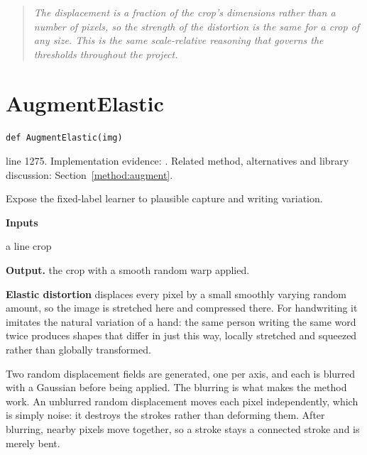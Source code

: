 \begin{quote}\small\itshape The displacement is a fraction of the crop's dimensions rather than a number of pixels, so the strength of the distortion is the same for a crop of any size. This is the same scale-relative reasoning that governs the thresholds throughout the project.\end{quote}


\section{AugmentElastic}\label{fn:train:AugmentElastic}
\begin{lstlisting}[style=sig]
def AugmentElastic(img)
\end{lstlisting}
 line 1275. Implementation evidence: \cite{code2026}. Related method, alternatives and library discussion: Section~\ref{method:augment}.


Expose the fixed-label learner to plausible capture and writing variation.




\noindent\textbf{Inputs}
\begin{description}[leftmargin=2.2em,style=nextline,font=\normalfont\ttfamily]\setlength\itemsep{1pt}
  \item[{img}] \normalfont a line crop
\end{description}

\noindent\textbf{Output.} the crop with a smooth random warp applied.


\textbf{Elastic distortion} \cite{simard2003} displaces every pixel by a small smoothly varying random amount, so the image is stretched here and compressed there. For handwriting it imitates the natural variation of a hand: the same person writing the same word twice produces shapes that differ in just this way, locally stretched and squeezed rather than globally transformed.


Two random displacement fields are generated, one per axis, and each is blurred with a Gaussian before being applied. The blurring is what makes the method work. An unblurred random displacement moves each pixel independently, which is simply noise: it destroys the strokes rather than deforming them. After blurring, nearby pixels move together, so a stroke stays a connected stroke and is merely bent.

